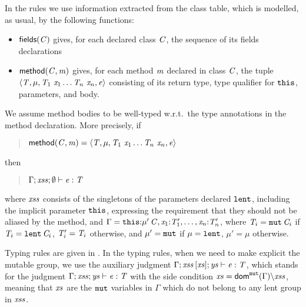 In the rules we use information extracted from the class table, which is modelled, as usual, by the following functions:{
\begin{itemize}
\item $\fields{\C}$ gives, for each declared class $\C$, the sequence of its fields declarations
\item {$\method{\C}{\m}$ gives, for each method $\m$ declared in class $\C$, the tuple\\
 $\FourTuple{\T}{\mu}{\Param{\T_1}{\x_1}\ldots\Param{\T_n}{\x_n}}{\e}$ consisting of its return type, type qualifier for $\this$, parameters, and body. }
\end{itemize}
We assume method bodies to be well-typed w.r.t.\ {the type annotations in the method declaration}. More precisely, if
{\begin{quote}
$\method{\C}{\m}=\FourTuple{\T}{\mu}{\Param{\T_1}{\x_1}\ldots\Param{\T_n}{\x_n}}{\e}$
\end{quote}
then 
\begin{quote}
$\TypeCheck{\Gamma}{\LentLocked}{\emptyset}{\e}{\T}$
\end{quote}
where $\LentLocked$ {consists of} the singletons of the parameters declared $\lent$, including the implicit parameter $\this$, expressing the requirement that they should not be aliased by the method, and $\Gamma=\TypeDec{\Type{\mu'}{\C}}{\this}, \TypeDec{\T'_1}{\x_1},\ldots,\TypeDec{\T'_n}{\x_n}$, where $\T_i=\Type{\mutable}{\C_i}$ if $\T_i=\Type{\lent}{\C_i}$, $\T'_i=\T_i$ otherwise, and $\mu'=\mutable$ if $\mu=\lent$, $\mu'=\mu$ otherwise. 
}

Typing rules are given in . {In the typing rules, when we need to make explicit the mutable group, we use the  auxiliary judgment $\AuxTypeCheck{\Gamma}{\LentLocked}{\MutGroup}{\StronglyLocked}{\e}{\T}$, which stands for the judgment 
$\TypeCheck{\Gamma}{\LentLocked}{\StronglyLocked}{\e}{\T}$ with the side condition $\MutGroup=\domMut{\Gamma}{\setminus}\LentLocked$, meaning that $\MutGroup$ are the $\mutable$ variables in $\Gamma$ which do not belong to {any lent} group in $\LentLocked$.}

}
